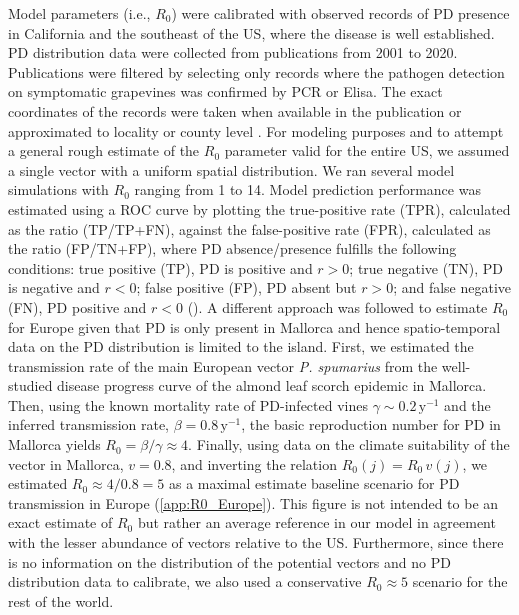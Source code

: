 Model parameters (i.e., $R_0$) were calibrated with observed records of PD
presence in California and the southeast of the US, where the disease is well
established. PD distribution data were collected from publications from 2001 to
2020. Publications were filtered by selecting only records where the pathogen
detection on symptomatic grapevines was confirmed by PCR or Elisa. The
exact coordinates of the records were taken when available in the publication
or approximated to locality or county level
\cite{Overall2015,Vanhove2019,Lieth2011,Anas2008,Hail2009,Wallingford2007,Myers2007,Albibi1998}.
For modeling purposes and to attempt a general rough estimate of the $R_0$
parameter valid for the entire US, we assumed a single vector with a uniform
spatial distribution. We ran several model simulations with $R_0$ ranging from
1 to 14.  Model prediction performance was estimated using a ROC curve by
plotting the true-positive rate (TPR), calculated as the ratio (TP/TP+FN),
against the false-positive rate (FPR), calculated as the ratio (FP/TN+FP),
where PD absence/presence fulfills the following conditions: true positive
(TP), PD is positive and $r>0$;  true negative (TN), PD is negative and $r<0$;
false positive (FP), PD absent but $r>0$; and false negative (FN), PD positive
and $r<0$ (\cite{jimenez2012insights}). A different approach was followed to
estimate $R_0$ for Europe given that PD is only present in Mallorca and hence
spatio-temporal data on the PD distribution is limited to the island. First, we
estimated the transmission rate of the main European vector \textit{P.
    spumarius} from the well-studied disease progress curve of the almond leaf
scorch epidemic in Mallorca. Then, using the known mortality rate of
PD-infected
vines $\gamma\sim 0.2 \, \textrm{y}^{-1}$ and the inferred transmission rate,
$\beta=0.8 \, \textrm{y}^{-1}$, the basic reproduction number for PD in
Mallorca
yields $R_0=\beta/\gamma\approx4$. Finally, using data on the climate
suitability of the vector in Mallorca, $v=0.8$, and inverting the relation
$R_0(j)=R_0\, v(j)$, we estimated $R_0\approx 4/0.8=5$ as a maximal estimate
baseline scenario for PD transmission in Europe (\cref{app:R0_Europe}). This
figure is not intended to be an exact estimate of $R_0$ but rather an average
reference in our model in agreement with the lesser abundance of vectors
relative to the US. Furthermore, since there is no information on the
distribution of the potential vectors and no PD distribution data to calibrate,
we also used a conservative $R_0 \approx 5$ scenario for the rest of the world.

